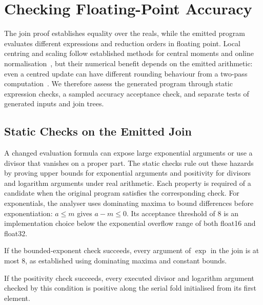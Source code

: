 \section{Checking Floating-Point Accuracy}
\label{sec:accuracy}

The join proof establishes equality over the reals, while the emitted program evaluates different expressions and reduction orders in floating point.
Local centring and scaling follow established methods for central moments and online normalisation~\citep{chan,pebay,milakov,blanchard}, but their numerical benefit depends on the emitted arithmetic: even a centred update can have different rounding behaviour from a two-pass computation~\citep{chan}.
We therefore assess the generated program through static expression checks, a sampled accuracy acceptance check, and separate tests of generated inputs and join trees.

\subsection{Static Checks on the Emitted Join}
\label{sec:hazards}
\label{sec:static}

A changed evaluation formula can expose large exponential arguments or use a divisor that vanishes on a proper part.
The static checks rule out these hazards by proving upper bounds for exponential arguments and positivity for divisors and logarithm arguments under real arithmetic.
Each property is required of a candidate when the original program satisfies the corresponding check.
For exponentials, the analyser uses dominating maxima to bound differences before exponentiation: $a\le m$ gives $a-m\le0$.
Its acceptance threshold of 8 is an implementation choice below the exponential overflow range of both float16 and float32.

\begin{proposition}
\label{prop:exp}
If the bounded-exponent check succeeds, every argument of $\exp$ in the join is at most 8, as established using dominating maxima and constant bounds.
\end{proposition}

\begin{proposition}
\label{prop:div}
If the positivity check succeeds, every executed divisor and logarithm argument checked by this condition is positive along the serial fold initialised from its first element.
\end{proposition}

